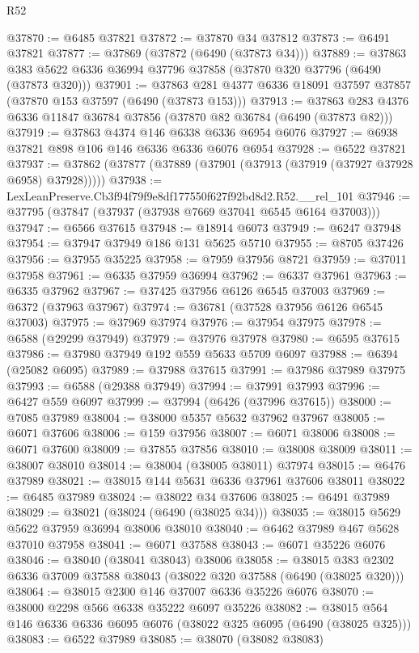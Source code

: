 \begin{lexlean}{R52}
\begin{coremodule}
@37870 := @6485 @37821
@37872 := @37870 @34 @37812
@37873 := @6491 @37821
@37877 := @37869 (@37872 (@6490 (@37873 @34)))
@37889 := @37863 @383 @5622 @6336 @36994 @37796 @37858 (@37870 @320 @37796 (@6490 (@37873 @320)))
@37901 := @37863 @281 @4377 @6336 @18091 @37597 @37857 (@37870 @153 @37597 (@6490 (@37873 @153)))
@37913 := @37863 @283 @4376 @6336 @11847 @36784 @37856 (@37870 @82 @36784 (@6490 (@37873 @82)))
@37919 := @37863 @4374 @146 @6338 @6336 @6954 @6076
@37927 := @6938 @37821 @898 @106 @146 @6336 @6336 @6076 @6954
@37928 := @6522 @37821
@37937 := @37862 (@37877 (@37889 (@37901 (@37913 (@37919 (@37927 @37928 @6958) @37928)))))
@37938 := LexLeanPreserve.Cb3f94f79f9e8df177550f627f92bd8d2.R52.__rel_101
@37946 := @37795 (@37847 (@37937 (@37938 @7669 @37041 @6545 @6164 @37003)))
@37947 := @6566 @37615
@37948 := @18914 @6073
@37949 := @6247 @37948
@37954 := @37947 @37949 @186 @131 @5625 @5710
@37955 := @8705 @37426
@37956 := @37955 @35225
@37958 := @7959 @37956 @8721
@37959 := @37011 @37958
@37961 := @6335 @37959 @36994
@37962 := @6337 @37961
@37963 := @6335 @37962
@37967 := @37425 @37956 @6126 @6545 @37003
@37969 := @6372 (@37963 @37967)
@37974 := @36781 (@37528 @37956 @6126 @6545 @37003)
@37975 := @37969 @37974
@37976 := @37954 @37975
@37978 := @6588 (@29299 @37949)
@37979 := @37976 @37978
@37980 := @6595 @37615
@37986 := @37980 @37949 @192 @559 @5633 @5709 @6097
@37988 := @6394 (@25082 @6095)
@37989 := @37988 @37615
@37991 := @37986 @37989 @37975
@37993 := @6588 (@29388 @37949)
@37994 := @37991 @37993
@37996 := @6427 @559 @6097
@37999 := @37994 (@6426 (@37996 @37615))
@38000 := @7085 @37989
@38004 := @38000 @5357 @5632 @37962 @37967
@38005 := @6071 @37606
@38006 := @159 @37956
@38007 := @6071 @38006
@38008 := @6071 @37600
@38009 := @37855 @37856
@38010 := @38008 @38009
@38011 := @38007 @38010
@38014 := @38004 (@38005 @38011) @37974
@38015 := @6476 @37989
@38021 := @38015 @144 @5631 @6336 @37961 @37606 @38011
@38022 := @6485 @37989
@38024 := @38022 @34 @37606
@38025 := @6491 @37989
@38029 := @38021 (@38024 (@6490 (@38025 @34)))
@38035 := @38015 @5629 @5622 @37959 @36994 @38006 @38010
@38040 := @6462 @37989 @467 @5628 @37010 @37958
@38041 := @6071 @37588
@38043 := @6071 @35226 @6076
@38046 := @38040 (@38041 @38043) @38006
@38058 := @38015 @383 @2302 @6336 @37009 @37588 @38043 (@38022 @320 @37588 (@6490 (@38025 @320)))
@38064 := @38015 @2300 @146 @37007 @6336 @35226 @6076
@38070 := @38000 @2298 @566 @6338 @35222 @6097 @35226
@38082 := @38015 @564 @146 @6336 @6336 @6095 @6076 (@38022 @325 @6095 (@6490 (@38025 @325)))
@38083 := @6522 @37989
@38085 := @38070 (@38082 @38083)

\end{coremodule}
\end{lexlean}

